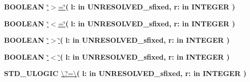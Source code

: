 \begin{DoxyCompactItemize}
\item 
{\bfseries {\bfseries \textcolor{comment}{B\+O\+O\+L\+E\+A\+N}\textcolor{vhdlchar}{ }}} \hyperlink{class__fixed__pkg_a4cd07e388cdbb3996dd11f56781d3758}{\char`\"{}$>$=\char`\"{}}{\bfseries  ( }{\bfseries \textcolor{vhdlchar}{l\+: }\textcolor{stringliteral}{in }\textcolor{vhdlchar}{U\+N\+R\+E\+S\+O\+L\+V\+E\+D\+\_\+sfixed}}{\bfseries  , \textcolor{vhdlchar}{r\+: }\textcolor{stringliteral}{in }{\bfseries \textcolor{comment}{I\+N\+T\+E\+G\+E\+R}\textcolor{vhdlchar}{ }}}{\bfseries  )} 
\item 
{\bfseries {\bfseries \textcolor{comment}{B\+O\+O\+L\+E\+A\+N}\textcolor{vhdlchar}{ }}} \hyperlink{class__fixed__pkg_a65b73a94d4fe541a941f431175b342b7}{\char`\"{}$<$=\char`\"{}}{\bfseries  ( }{\bfseries \textcolor{vhdlchar}{l\+: }\textcolor{stringliteral}{in }\textcolor{vhdlchar}{U\+N\+R\+E\+S\+O\+L\+V\+E\+D\+\_\+sfixed}}{\bfseries  , \textcolor{vhdlchar}{r\+: }\textcolor{stringliteral}{in }{\bfseries \textcolor{comment}{I\+N\+T\+E\+G\+E\+R}\textcolor{vhdlchar}{ }}}{\bfseries  )} 
\item 
{\bfseries {\bfseries \textcolor{comment}{B\+O\+O\+L\+E\+A\+N}\textcolor{vhdlchar}{ }}} \hyperlink{class__fixed__pkg_ac6c82329bf849852be997a3d0a737cf9}{\char`\"{}$>$\char`\"{}}{\bfseries  ( }{\bfseries \textcolor{vhdlchar}{l\+: }\textcolor{stringliteral}{in }\textcolor{vhdlchar}{U\+N\+R\+E\+S\+O\+L\+V\+E\+D\+\_\+sfixed}}{\bfseries  , \textcolor{vhdlchar}{r\+: }\textcolor{stringliteral}{in }{\bfseries \textcolor{comment}{I\+N\+T\+E\+G\+E\+R}\textcolor{vhdlchar}{ }}}{\bfseries  )} 
\item 
{\bfseries {\bfseries \textcolor{comment}{B\+O\+O\+L\+E\+A\+N}\textcolor{vhdlchar}{ }}} \hyperlink{class__fixed__pkg_a5d059cf3277e3585e4f3f076db10b273}{\char`\"{}$<$\char`\"{}}{\bfseries  ( }{\bfseries \textcolor{vhdlchar}{l\+: }\textcolor{stringliteral}{in }\textcolor{vhdlchar}{U\+N\+R\+E\+S\+O\+L\+V\+E\+D\+\_\+sfixed}}{\bfseries  , \textcolor{vhdlchar}{r\+: }\textcolor{stringliteral}{in }{\bfseries \textcolor{comment}{I\+N\+T\+E\+G\+E\+R}\textcolor{vhdlchar}{ }}}{\bfseries  )} 
\item 
{\bfseries {\bfseries \textcolor{comment}{S\+T\+D\+\_\+\+U\+L\+O\+G\+I\+C}\textcolor{vhdlchar}{ }}} \hyperlink{class__fixed__pkg_a69151531d87456d952c2073704fa1779}{\textbackslash{}?=\textbackslash{}}{\bfseries  ( }{\bfseries \textcolor{vhdlchar}{l\+: }\textcolor{stringliteral}{in }\textcolor{vhdlchar}{U\+N\+R\+E\+S\+O\+L\+V\+E\+D\+\_\+sfixed}}{\bfseries  , \textcolor{vhdlchar}{r\+: }\textcolor{stringliteral}{in }{\bfseries \textcolor{comment}{I\+N\+T\+E\+G\+E\+R}\textcolor{vhdlchar}{ }}}{\bfseries  )} 

\end{DoxyCompactItemize}
